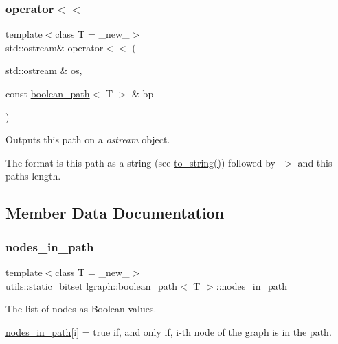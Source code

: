 \subsubsection{\texorpdfstring{operator$<$$<$}{operator<<}}
{\footnotesize\ttfamily template$<$class T = \+\_\+new\+\_\+$>$ \\
std\+::ostream\& operator$<$$<$ (\begin{DoxyParamCaption}\item[{std\+::ostream \&}]{os,  }\item[{const \hyperlink{classlgraph_1_1boolean__path}{boolean\+\_\+path}$<$ T $>$ \&}]{bp }\end{DoxyParamCaption})\hspace{0.3cm}{\ttfamily [friend]}}



Outputs this path on a {\itshape ostream} object. 

The format is this path as a string (see \hyperlink{classlgraph_1_1boolean__path_a28c70d226f016ff660aa12f9ba7ae00e}{to\+\_\+string()}) followed by \textquotesingle{}-\/$>$\textquotesingle{} and this path\textquotesingle{}s length. 

\subsection{Member Data Documentation}
\mbox{\label{classlgraph_1_1boolean__path_a0ea5d4c5f7e445270bb5c0346ec7c150}} 
\subsubsection{\texorpdfstring{nodes\+\_\+in\+\_\+path}{nodes\_in\_path}}
{\footnotesize\ttfamily template$<$class T = \+\_\+new\+\_\+$>$ \\
\hyperlink{classlgraph_1_1utils_1_1static__bitset}{utils\+::static\+\_\+bitset} \hyperlink{classlgraph_1_1boolean__path}{lgraph\+::boolean\+\_\+path}$<$ T $>$\+::nodes\+\_\+in\+\_\+path\hspace{0.3cm}{\ttfamily [private]}}



The list of nodes as Boolean values. 

\hyperlink{classlgraph_1_1boolean__path_a0ea5d4c5f7e445270bb5c0346ec7c150}{nodes\+\_\+in\+\_\+path}\mbox{[}i\mbox{]} = true if, and only if, i-\/th node of the graph is in the path. \mbox{\label{classlgraph_1_1boolean__path_ab298ac156fd7d73e21769fd30b2c5ad1}} 
